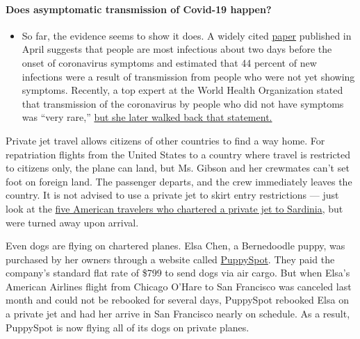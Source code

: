 \begin{itemize}
{  \paragraph{Does asymptomatic transmission of Covid-19
  happen?}\label{does-asymptomatic-transmission-of-covid-19-happen}}

  \begin{itemize}
  \tightlist
  \item
    So far, the evidence seems to show it does. A widely cited
    \href{https://www.nature.com/articles/s41591-020-0869-5}{paper}
    published in April suggests that people are most infectious about
    two days before the onset of coronavirus symptoms and estimated that
    44 percent of new infections were a result of transmission from
    people who were not yet showing symptoms. Recently, a top expert at
    the World Health Organization stated that transmission of the
    coronavirus by people who did not have symptoms was ``very rare,''
    \href{https://www.nytimes3xbfgragh.onion/2020/06/09/world/coronavirus-updates.html?action=click\&pgtype=Article\&state=default\&region=MAIN_CONTENT_3\&context=storylines_faq\#link-1f302e21}{but
    she later walked back that statement.}
  \end{itemize}
\end{itemize}

Private jet travel allows citizens of other countries to find a way
home. For repatriation flights from the United States to a country where
travel is restricted to citizens only, the plane can land, but Ms.
Gibson and her crewmates can't set foot on foreign land. The passenger
departs, and the crew immediately leaves the country. It is not advised
to use a private jet to skirt entry restrictions --- just look at the
\href{https://www.nytimes3xbfgragh.onion/2020/07/07/world/europe/american-passport-privilege-coronavirus.html}{five
American travelers who chartered a private jet to Sardinia}, but were
turned away upon arrival.

Even dogs are flying on chartered planes. Elsa Chen, a Bernedoodle
puppy, was purchased by her owners through a website called
\href{https://www.puppyspot.com/}{PuppySpot}. They paid the company's
standard flat rate of \$799 to send dogs via air cargo. But when Elsa's
American Airlines flight from Chicago O'Hare to San Francisco was
canceled last month and could not be rebooked for several days,
PuppySpot rebooked Elsa on a private jet and had her arrive in San
Francisco nearly on schedule. As a result, PuppySpot is now flying all
of its dogs on private planes.

